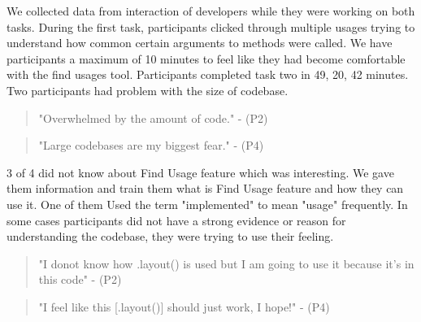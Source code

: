 \documentclass[conference]{IEEEtran}
\begin{document}
We collected data from interaction of developers while they were working on both tasks. During the first task, participants clicked through multiple usages trying to understand how common certain arguments to methods were called. We have participants a maximum of 10 minutes to feel like they had become comfortable with the find usages tool. Participants completed task two in 49, 20, 42 minutes. Two participants had problem with the size of codebase.
\begin{quote}"Overwhelmed by the amount of code." - (P2) \end{quote}
\begin{quote}"Large codebases are my biggest fear." - (P4) \end{quote}
3 of 4 did not know about Find Usage feature which was interesting. We gave them information and train them what is Find Usage feature and how they can use it. One of them Used the term "implemented" to mean "usage" frequently. In some cases participants did not have a strong evidence or reason for understanding the codebase, they were trying to use their feeling. 
\begin{quote}"I donot know how .layout() is used but I am going to use it because it's in this code" - (P2) \end{quote}
\begin{quote}"I feel like this [.layout()] should just work, I hope!" - (P4) \end{quote}
\end{document}
